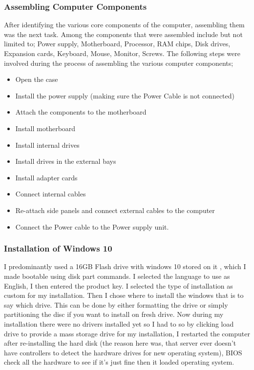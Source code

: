 \documentclass{article}
\begin{document}
\subsubsection{Assembling Computer Components}
After identifying the various core components of the computer, assembling them was the next task. Among the components that were assembled include but not limited to; Power supply, Motherboard, Processor, RAM chips, Disk drives, Expansion cards, Keyboard, Mouse, Monitor, Screws.
The following steps were involved during the process of assembling the various computer components;
\begin{itemize}
\item Open the case
\item  Install the power supply (making sure the Power Cable is not connected)
\item Attach the components to the motherboard
\item  Install motherboard
\item Install internal drives
\item Install drives in the external bays
\item Install adapter cards
\item Connect internal cables
\item Re-attach side panels and connect external cables to the computer
\item Connect the Power cable to the Power supply unit.
\end{itemize}
\subsubsection{Installation of Windows 10}
I predominantly used a 16GB Flash drive with windows 10 stored on it , which I made bootable  using disk part commands. I selected the language to use as English, I then entered the product key. I selected the type of installation as custom for my installation. Then I chose where to install the windows that is to say  which drive. This can be done by either formatting the drive or simply partitioning the disc if you want to install on fresh drive. Now during my installation there were no drivers installed yet so I had to so by clicking load drive to provide a mass storage drive for my installation, I restarted the computer after re-installing the hard disk (the reason here was, that server ever doesn't have controllers to detect the hardware drives for new operating system), BIOS check all the hardware to see if it's just fine then it loaded operating system.
\end{document}

